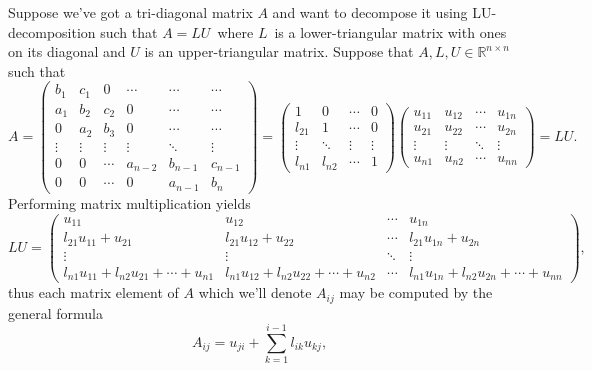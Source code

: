 \documentclass[english,notitlepage]{revtex4-1}  %
\begin{document}
Suppose we've got a tri-diagonal matrix $A$ and want to decompose it using LU-decomposition such that $A = LU$ where $L$ is a lower-triangular matrix with ones on its diagonal and $U$ is an upper-triangular matrix. Suppose that $A,L,U \in \mathbb{R}^{n\times n}$ such that 
\begin{equation} A= 
	\begin{pmatrix}
	b_1 & c_1 & 0 & \cdots & \cdots & \cdots \\
	a_1 & b_2 & c_2 & 0  &\cdots & \cdots  \\ 
	0 & a_2 & b_3 & 0 & \cdots & \cdots \\
	\vdots & \vdots & \vdots & \vdots & \ddots & \vdots \\
	0 & 0 & \cdots & a_{n-2} & b_{n-1} & c_{n-1} \\
	0 & 0 & \cdots  & 0 & a_{n-1} & b_n
	\end{pmatrix}
	= 
	\begin{pmatrix}
	1 & 0 & \cdots & 0\\
	l_{21} & 1 &  \cdots & 0 \\ 
	\vdots  & \ddots & \vdots & \vdots  \\
	l_{n1} & l_{n2} & \cdots & 1  
	\end{pmatrix}
	\begin{pmatrix}
	u_{11} & u_{12} & \cdots & u_{1n} \\ 
	u_{21} & u_{22} & \cdots & u_{2n} \\
	\vdots & \vdots & \ddots & \vdots \\
	u_{n1} & u_{n2} & \cdots & u_{nn}
	\end{pmatrix}
	= LU.
\end{equation}
Performing matrix multiplication yields 
\begin{equation}\label{LU_decomp}
	LU = \begin{pmatrix}
	u_{11} & u_{12} & \cdots & u_{1n} \\
	l_{21}u_{11} + u_{21} & l_{21}u_{12} + u_{22} & \cdots & l_{21}u_{1n} + u_{2n} \\
	\vdots & \vdots & \ddots & \vdots \\
	l_{n1}u_{11} + l_{n2}u_{21} + \cdots + u_{n1} & l_{n1}u_{12} + l_{n2}u_{22} + \cdots + u_{n2} & \cdots & l_{n1}u_{1n} + l_{n2}u_{2n} + \cdots + u_{nn}
	\end{pmatrix},
\end{equation}
thus each matrix element of $A$ which we'll denote $A_{ij}$ may be computed by the general formula 
\begin{equation}\label{matrix_elements}
	A_{ij} = u_{ji} + \sum_{k = 1}^{i-1} l_{ik}u_{kj},
\end{equation}
\end{document}
